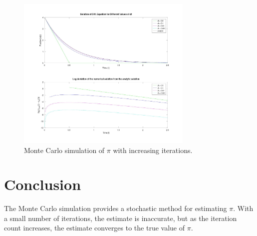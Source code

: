 \begin{figure}[h!]
  \centering

    \includegraphics[width=0.75\textwidth]{a1.jpg}
    \caption{Monte Carlo simulation of $\pi$ with increasing iterations.}
\end{figure}

\section*{Conclusion}
The Monte Carlo simulation provides a stochastic method for estimating $\pi$. With a small number of iterations, the estimate is inaccurate, but as the iteration count increases, the estimate converges to the true value of $\pi$.
